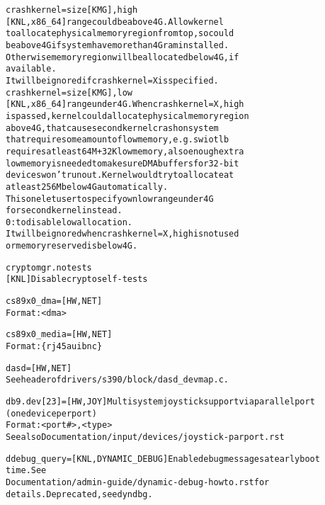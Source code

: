 \documentclass[a4paper,8pt,english]{sphinxmanual}
\begin{document}
\begin{alltt}
        crashkernel=size{[}KMG{]},high
                        {[}KNL, x86\_64{]} range could be above 4G. Allow kernel
                        to allocate physical memory region from top, so could
                        be above 4G if system have more than 4G ram installed.
                        Otherwise memory region will be allocated below 4G, if
                        available.
                        It will be ignored if crashkernel=X is specified.
        crashkernel=size{[}KMG{]},low
                        {[}KNL, x86\_64{]} range under 4G. When crashkernel=X,high
                        is passed, kernel could allocate physical memory region
                        above 4G, that cause second kernel crash on system
                        that require some amount of low memory, e.g. swiotlb
                        requires at least 64M+32K low memory, also enough extra
                        low memory is needed to make sure DMA buffers for 32-bit
                        devices won't run out. Kernel would try to allocate at
                        at least 256M below 4G automatically.
                        This one let user to specify own low range under 4G
                        for second kernel instead.
                        0: to disable low allocation.
                        It will be ignored when crashkernel=X,high is not used
                        or memory reserved is below 4G.

        cryptomgr.notests
                        {[}KNL{]} Disable crypto self-tests

        cs89x0\_dma=     {[}HW,NET{]}
                        Format: \textless{}dma\textgreater{}

        cs89x0\_media=   {[}HW,NET{]}
                        Format: \{ rj45 \textbar{} aui \textbar{} bnc \}

        dasd=           {[}HW,NET{]}
                        See header of drivers/s390/block/dasd\_devmap.c.

        db9.dev{[}2\textbar{}3{]}=   {[}HW,JOY{]} Multisystem joystick support via parallel port
                        (one device per port)
                        Format: \textless{}port\#\textgreater{},\textless{}type\textgreater{}
                        See also Documentation/input/devices/joystick-parport.rst

        ddebug\_query=   {[}KNL,DYNAMIC\_DEBUG{]} Enable debug messages at early boot
                        time. See
                        Documentation/admin-guide/dynamic-debug-howto.rst for
                        details.  Deprecated, see dyndbg.


\end{alltt}
\end{document}
